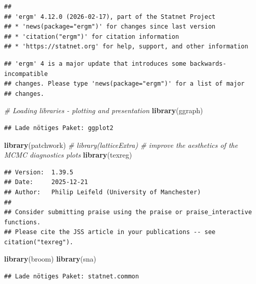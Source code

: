 \documentclass[
]{article}
\newenvironment{Shaded}{\begin{snugshade}}{\end{snugshade}}
\newcommand{\CommentTok}[1]{\textcolor[rgb]{0.56,0.35,0.01}{\textit{#1}}}
\newcommand{\FunctionTok}[1]{\textcolor[rgb]{0.13,0.29,0.53}{\textbf{#1}}}
\newcommand{\NormalTok}[1]{#1}
\begin{document}
\begin{verbatim}
## 
## 'ergm' 4.12.0 (2026-02-17), part of the Statnet Project
## * 'news(package="ergm")' for changes since last version
## * 'citation("ergm")' for citation information
## * 'https://statnet.org' for help, support, and other information
\end{verbatim}

\begin{verbatim}
## 'ergm' 4 is a major update that introduces some backwards-incompatible
## changes. Please type 'news(package="ergm")' for a list of major
## changes.
\end{verbatim}

\begin{Shaded}
\begin{Highlighting}[]
\CommentTok{\# Loading libraries {-} plotting and presentation}
\FunctionTok{library}\NormalTok{(ggraph)}
\end{Highlighting}
\end{Shaded}

\begin{verbatim}
## Lade nötiges Paket: ggplot2
\end{verbatim}

\begin{Shaded}
\begin{Highlighting}[]
\FunctionTok{library}\NormalTok{(patchwork)}
\CommentTok{\# library(latticeExtra) \# improve the aesthetics of the MCMC diagnostics plots}
\FunctionTok{library}\NormalTok{(texreg)}
\end{Highlighting}
\end{Shaded}

\begin{verbatim}
## Version:  1.39.5
## Date:     2025-12-21
## Author:   Philip Leifeld (University of Manchester)
## 
## Consider submitting praise using the praise or praise_interactive functions.
## Please cite the JSS article in your publications -- see citation("texreg").
\end{verbatim}

\begin{Shaded}
\begin{Highlighting}[]
\FunctionTok{library}\NormalTok{(broom)}
\FunctionTok{library}\NormalTok{(sna)}
\end{Highlighting}
\end{Shaded}

\begin{verbatim}
## Lade nötiges Paket: statnet.common
\end{verbatim}
\end{document}
